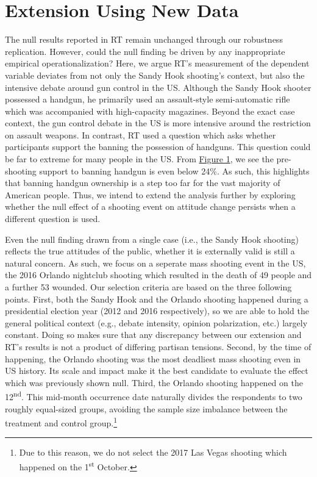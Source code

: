 \documentclass[11pt]{article}
\begin{document}
\section*{Extension Using New Data}
The null results reported in RT remain unchanged through our robustness replication. However, could the null finding be driven by any inappropriate empirical operationalization? Here, we argue RT’s measurement of the dependent variable deviates from not only the Sandy Hook shooting’s context, but also the intensive debate around gun control in the US. Although the Sandy Hook shooter possessed a handgun, he primarily used an assault-style semi-automatic rifle which was accompanied with high-capacity magazines. Beyond the exact case context, the gun control debate in the US is more intensive around the restriction on assault weapons. In contrast, RT used a question which asks whether participants support the banning the possession of handguns. This question could be far to extreme for many people in the US. From \hyperref[fig1]{Figure 1}, we see the pre-shooting support to banning handgun is even below 24\%. As such, this highlights that banning handgun ownership is a step too far for the vast majority of American people. Thus, we intend to extend the analysis further by exploring whether the null effect of a shooting event on attitude change persists when a different question is used.

Even the null finding drawn from a single case (i.e., the Sandy Hook shooting) reflects the true attitudes of the public, whether it is externally valid is still a natural concern. As such, we focus on a seperate mass shooting event in the US, the 2016 Orlando nightclub shooting which resulted in the death of 49 people and a further 53 wounded. Our selection criteria are based on the three following points. First, both the Sandy Hook and the Orlando shooting happened during a presidential election year (2012 and 2016 respectively), so we are able to hold the general political context (e.g., debate intensity, opinion polarization, etc.) largely constant. Doing so makes sure that any discrepancy between our extension and RT's results is not a product of differing partisan tensions. Second, by the time of happening, the Orlando shooting was the most deadliest mass shooting even in US history. Its scale and impact make it the best candidate to evaluate the effect which was previously shown null. Third, the Orlando shooting happened on the 12\textsuperscript{nd}. This mid-month occurrence date naturally divides the respondents to two roughly equal-sized groups, avoiding the sample size imbalance between the treatment and control group.\footnote{Due to this reason, we do not select the 2017 Las Vegas shooting which happened on the 1\textsuperscript{st} October.}
\end{document}
